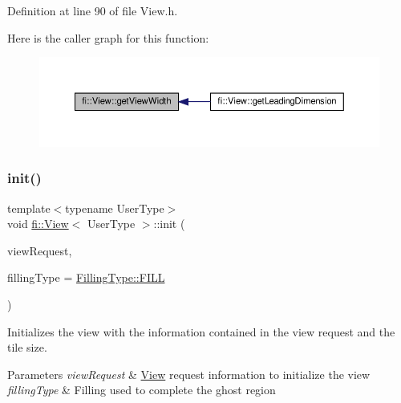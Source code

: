 Definition at line 90 of file View.\+h.

Here is the caller graph for this function\+:
\nopagebreak
\begin{figure}[H]
\begin{center}
\leavevmode
\includegraphics[width=350pt]{d5/dd4/classfi_1_1View_aa2682cae27645a080fb51ce39d1667b4_icgraph}
\end{center}
\end{figure}
\mbox{\label{classfi_1_1View_a45cf9767af7b68e813e166d24acab720}} 
\subsubsection{\texorpdfstring{init()}{init()}}
{\footnotesize\ttfamily template$<$typename User\+Type$>$ \\
void \hyperlink{classfi_1_1View}{fi\+::\+View}$<$ User\+Type $>$\+::init (\begin{DoxyParamCaption}\item[{const std\+::shared\+\_\+ptr$<$ \hyperlink{classfi_1_1HTGSViewRequestData}{fi\+::\+H\+T\+G\+S\+View\+Request\+Data}$<$ User\+Type $>$$>$ \&}]{view\+Request,  }\item[{\hyperlink{namespacefi_a6808b618c85d179a330ca388162215bd}{Filling\+Type}}]{filling\+Type = {\ttfamily \hyperlink{namespacefi_a6808b618c85d179a330ca388162215bdae8225b11842409df543692aebed34fd1}{Filling\+Type\+::\+F\+I\+LL}} }\end{DoxyParamCaption})\hspace{0.3cm}{\ttfamily [inline]}}



Initializes the view with the information contained in the view request and the tile size. 


\begin{DoxyParams}{Parameters}
{\em view\+Request} & \hyperlink{classfi_1_1View}{View} request information to initialize the view \\
\hline
{\em filling\+Type} & Filling used to complete the ghost region \\
\hline
\end{DoxyParams}


